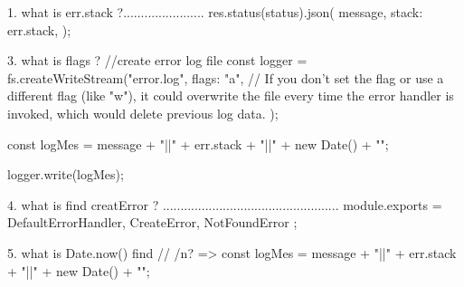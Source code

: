 
1. what is err.stack ?.......................
     res.status(status).json({
       message,
       stack: err.stack,
     });

3. what is flags ?
//create error log file
const logger = fs.createWriteStream("error.log", {
  flags: "a", // If you don’t set the flag or use a different flag (like "w"), it could overwrite the file every time the error handler is invoked, which would delete previous log data.
});

const logMes = message + "||" + err.stack + "||" + new Date() + "\n";

logger.write(logMes);

4. what is find creatError ? ..................................................
   module.exports = { DefaultErrorHandler, CreateError, NotFoundError };

5. what is Date.now() find // /n?
   => const logMes = message + "||" + err.stack + "||" + new Date() + "\n";